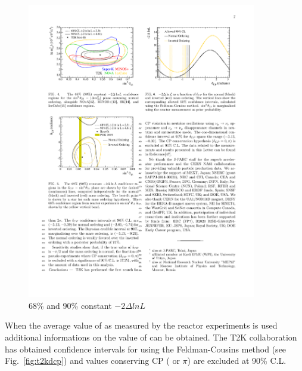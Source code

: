 \begin{figure} [h!]
\begin{center}
\includegraphics[width=10cm]{figures/t2k_joint_th13dcp.pdf}
\caption{\label{fig:t2kjoint} 68\% and 90\%  constant $-2\Delta ln L$}
\end{center}
\end{figure}


When the average value of \thint as measured by the reactor experiments is used additional informations on the value of \dcp can be obtained. The T2K collaboration has obtained confidence intervals for \dcp using the Feldman-Cousins method (see Fig.~\ref{fig:t2kdcp}) and values conserving CP ( or $\pi$) are excluded at 90\% C.L.

